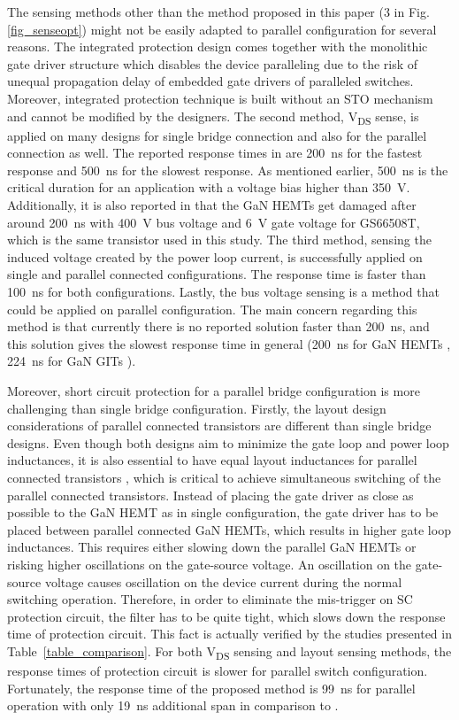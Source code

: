 \documentclass[journal]{IEEEtran}
\begin{document}
The sensing methods other than the method proposed in this paper (3 in Fig. \ref{fig_senseopt}) might not be easily adapted to parallel configuration for several reasons. The integrated protection design comes together with the monolithic gate driver structure which disables the device paralleling due to the risk of unequal propagation delay of embedded gate drivers of paralleled switches. Moreover, integrated protection technique is built without an STO mechanism and cannot be modified by the designers. The second method, V\textsubscript{DS} sense, is applied on many designs for single bridge connection and also for the parallel connection \cite{Gui2018} as well. The reported response times in \cite{Gui2018} are 200~ns for the fastest response and 500~ns for the slowest response. As mentioned earlier, 500~ns is the critical duration for an application with a voltage bias higher than 350~V. Additionally, it is also reported in \cite{Wu2020} that the GaN HEMTs get damaged after around 200~ns with 400~V bus voltage and 6~V gate voltage for GS66508T, which is the same transistor used in this study. The third method, sensing the induced voltage created by the power loop current, is successfully applied on single and parallel connected configurations. The response time is faster than 100~ns for both configurations. Lastly, the bus voltage sensing is a method that could be applied on parallel configuration. The main concern regarding this method is that currently there is no reported solution faster than 200~ns, and this solution gives the slowest response time in general (200~ns for GaN HEMTs \cite{Lyu2020}, 224~ns for GaN GITs \cite{Wang2019}).

Moreover, short circuit protection for a parallel bridge configuration is more challenging than single bridge configuration. Firstly, the layout design considerations of parallel connected transistors are different than single bridge designs. Even though both designs aim to minimize the gate loop and power loop inductances, it is also essential to have equal layout inductances for parallel connected transistors \cite{Lu2017a}, which is critical to achieve simultaneous switching of the parallel connected transistors. Instead of placing the gate driver as close as possible to the GaN HEMT as in single configuration, the gate driver has to be placed between parallel connected GaN HEMTs, which results in higher gate loop inductances. This requires either slowing down the parallel GaN HEMTs \cite{Reusch2016} or risking higher oscillations on the gate-source voltage. An oscillation on the gate-source voltage causes oscillation on the device current during the normal switching operation. Therefore, in order to eliminate the mis-trigger on SC protection circuit, the filter has to be quite tight, which slows down the response time of protection circuit. This fact is actually verified by the studies presented in Table~\ref{table_comparison}. For both  V\textsubscript{DS} sensing and layout sensing methods, the response times  of protection circuit is slower for parallel switch configuration. Fortunately, the response time of the proposed method is 99~ns for parallel operation with only 19~ns additional span in comparison to \cite{Alemdar2019}.
\end{document}
